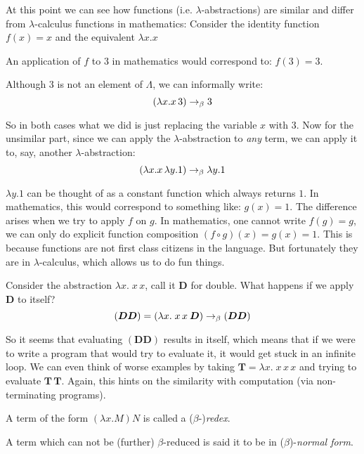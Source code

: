 At this point we can see how functions (i.e. $\lambda$-abstractions) are
similar and differ from $\lambda$-calculus functions in mathematics:
Consider the identity function $f(x) = x$ and the equivalent $\lambda x. x$

An application of $f$ to $3$ in mathematics would correspond to: $f(3) = 3$.

Although $3$ is not an element of $\Lambda$, we can informally write:
    \[ (\lambda x. x\, 3) \rightarrow_\beta 3 \]

So in both cases what we did is just replacing the variable $x$ with $3$. Now
for the unsimilar part, since we can apply the $\lambda$-abstraction to
\emph{any} term, we can apply it to, say, another $\lambda$-abstraction:
    \[ (\lambda x. x\, \lambda y. 1) \rightarrow_\beta \lambda y. 1 \]

$\lambda y. 1$ can be thought of as a constant function which always returns
$1$.  In mathematics, this would correspond to something like: $g(x) = 1$.  The
difference arises when we try to apply $f$ on $g$. In mathematics, one cannot
write $f(g) = g$, we can only do explicit function composition $(f \circ g)(x) =
g(x) = 1$. This is because functions are not first class citizens in the
language. But fortunately they are in $\lambda$-calculus, which allows us to do
fun things.

Consider the abstraction $\lambda x.\; x\, x$, call it $\bm{D}$ for double.
What happens if we apply $\bm{D}$ to itself?
    \[ (\bm{D} \bm{D}) = (\lambda x.\; x\, x\: \bm{D})
        \rightarrow_\beta (\bm{D} \bm{D}) \]

So it seems that evaluating $(\bm{D} \bm{D})$ results in itself, which means
that if we were to write a program that would try to evaluate it, it would get
stuck in an infinite loop. We can even think of worse examples by taking
$\bm{T} = \lambda x.\; x\, x\,x$ and trying to evaluate $\bm{T}\, \bm{T}$.
Again, this hints on the similarity with computation (via non-terminating
programs).

\begin{definition}
    A term of the form $(\lambda x. M) N$ is called a ($\beta$-)\emph{redex}.
\end{definition}
\begin{definition}
    A term which can not be (further) $\beta$-reduced is said it to be in
    ($\beta$)-\emph{normal form}.
\end{definition}

